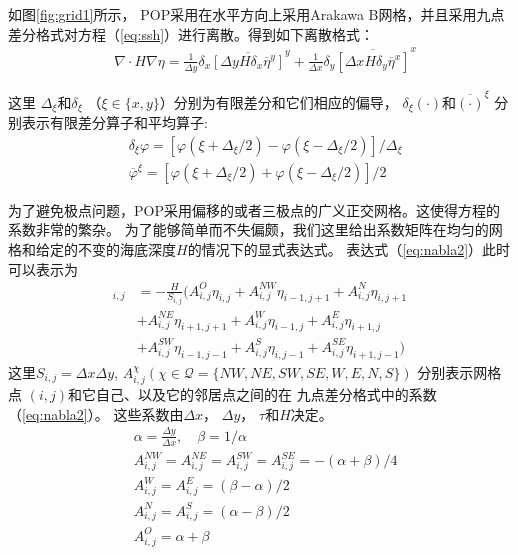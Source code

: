 如图\ref{fig:grid1}所示， POP采用在水平方向上采用Arakawa B网格\cite{smith2010parallel}，并且采用九点差分格式对方程（\ref{eq:ssh}）进行离散。得到如下离散格式：
\begin{align}
    & \nabla\cdot H \nabla \eta  =\frac{1}{\Delta y}\delta_x \overline{[\Delta y H  \delta_x\overline{\eta}^y]}^y +\frac{1}{\Delta x}\delta_y \overline{[\Delta x H  \delta_y\overline{\eta}^x]}^x \label{eq:nabla2}
  \end{align}

这里 $\Delta_\xi$和$\delta_\xi$  （$\xi \in \{x, y\} $）分别为有限差分和它们相应的偏导，  $\delta_\xi (\cdot) $和$\overline{(\cdot)}^\xi $ 分别表示有限差分算子和平均算子:  
\begin{align}
&\delta_\xi \varphi = [\varphi (\xi+\Delta_\xi/2) -\varphi(\xi-\Delta_\xi/2)]/\Delta_\xi \\
&\overline{\varphi}^\xi  =[\varphi (\xi+\Delta_\xi/2) +\varphi(\xi-\Delta_\xi/2)]/2
\end{align}
 
 

为了避免极点问题，POP采用偏移的或者三极点的广义正交网格。这使得方程的系数非常的繁杂。
为了能够简单而不失偏颇，我们这里给出系数矩阵在均匀的网格和给定的不变的海底深度$H$的情况下的显式表达式。
表达式（\ref{eq:nabla2}）此时可以表示为
\begin{align}
 [\nabla\cdot H \nabla \eta]_{i,j}&= -\frac{H}{S_{i,j}}(A_{i,j}^O\eta_{i,j}+A_{i,j}^{NW}\eta_{i-1,j+1}+A_{i,j}^N\eta_{i,j+1} \nonumber\\
 &+A_{i,j}^{NE}\eta_{i+1,j+1}+A_{i,j}^W\eta_{i-1,j} +A_{i,j}^E\eta_{i+1,j} \nonumber\\
& +A_{i,j}^{SW}\eta_{i-1,j-1} +A_{i,j}^S\eta_{i,j-1}+ A_{i,j}^{SE}\eta_{i+1,j-1})
\end{align}
这里$S_{i,j}  = \Delta x\Delta y$, $A_{i,j}^{\chi } ( \chi \in \mathcal{Q} = \{NW,NE, SW, SE, W, E, N, S\})$ 分别表示网格点 $(i,j)$和它自己、以及它的邻居点之间的在 九点差分格式中的系数（\ref{eq:nabla2}）。 这些系数由$\Delta x$， $\Delta y$， $\tau$和$H$决定。
\begin{equation} \label{defineA}
\begin{aligned}
&\alpha  = \frac{ \Delta y}{ \Delta x }, \quad \beta  = 1/\alpha \\
&A_{i,j}^{NW} = A_{i,j}^{NE} =A_{i,j}^{SW} = A_{i,j}^{SE} = - (\alpha  +  \beta  )/4 \\
&A_{i,j}^{W} = A_{i,j}^{E} = (  \beta  -\alpha  )/2 \\
&A_{i,j}^{N} = A_{i,j}^{S} = (\alpha  -\beta )/2 \\
&A_{i,j}^{O} =   \alpha   +\beta  \\
\end{aligned}
\end{equation}


